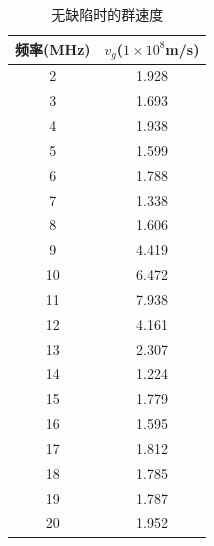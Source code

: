 \documentclass[fleqn,10pt]{SelfArx} %
\begin{document}
\begin{table}[h]
	\centering
	\begin{tabular}{|c|c|}
	\hline
	频率(MHz) & $v_g$($1\times10^8$m/s)    \\ \hline
	2    & 1.928 \\ \hline
	3    & 1.693 \\ \hline
	4    & 1.938 \\ \hline
	5    & 1.599 \\ \hline
	6    & 1.788 \\ \hline
	7    & 1.338 \\ \hline
	8    & 1.606 \\ \hline
	9    & 4.419 \\ \hline
	10   & 6.472 \\ \hline
	11   & 7.938 \\ \hline
	12   & 4.161 \\ \hline
	13   & 2.307 \\ \hline
	14   & 1.224 \\ \hline
	15   & 1.779 \\ \hline
	16   & 1.595 \\ \hline
	17   & 1.812 \\ \hline
	18   & 1.785 \\ \hline
	19   & 1.787 \\ \hline
	20   & 1.952 \\ \hline
	\end{tabular}
	\caption{无缺陷时的群速度}
	\label{tab:app3}
\end{table}
\end{document}
